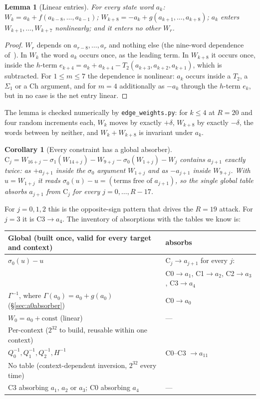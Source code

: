 \documentclass[11pt,a4paper]{article}
\newtheorem{corollary}{Corollary}
\newtheorem{lemma}{Lemma}
\newcommand{\Sig}[1]{\Sigma_{#1}}
\newcommand{\sig}[1]{\sigma_{#1}}
\newcommand{\Ch}{\mathrm{Ch}}
\begin{document}
\begin{lemma}[Linear entries]
\label{lem:linear}
For every state word $a_k$: $W_k = a_k + f(a_{k-8},\ldots,a_{k-1})$;
$W_{k+8} = -a_k + g(a_{k+1},\ldots,a_{k+8})$; $a_k$ enters
$W_{k+1},\ldots,W_{k+7}$ nonlinearly; and it enters no other $W_r$.
\end{lemma}
\begin{proof}
$W_r$ depends on $a_{r-8},\ldots,a_r$ and nothing else (the nine-word
dependence of~\cite{Basra2026R19}).  In $W_k$ the word $a_k$ occurs once, as
the leading term.  In $W_{k+8}$ it occurs once, inside the $h$-term
$e_{k+4}=a_k+a_{k+4}-T_2(a_{k+3},a_{k+2},a_{k+1})$, which is subtracted.  For
$1\le m\le7$ the dependence is nonlinear: $a_k$ occurs inside a $T_2$, a
$\Sig{1}$ or a $\Ch$ argument, and for $m=4$ additionally as $-a_k$ through
the $h$-term $e_k$, but in no case is the net entry linear.
\end{proof}

The lemma is checked numerically by \texttt{edge\_weights.py}: for $k\le4$
at $R{=}20$ and four random increments each, $W_k$ moves by exactly
$+\delta$, $W_{k+8}$ by exactly $-\delta$, the words between by neither, and
$W_k+W_{k+8}$ is invariant under $a_k$.

\begin{corollary}[Every constraint has a global absorber]
\label{cor:absorb}
$\mathrm{C}_j = W_{16+j}-\sig{1}(W_{14+j})-W_{9+j}-\sig{0}(W_{1+j})-W_j$
contains $a_{j+1}$ exactly twice: as $+a_{j+1}$ inside the $\sig{0}$ argument
$W_{1+j}$ and as $-a_{j+1}$ inside $W_{9+j}$.  With $u=W_{1+j}$ it reads
$\sig{0}(u)-u = (\text{terms free of } a_{j+1})$, so the single global table
absorbs $a_{j+1}$ from $\mathrm{C}_j$ for every $j=0,\ldots,R-17$.
\end{corollary}

For $j=0,1,2$ this is the opposite-sign pattern that drives the $R{=}19$
attack.  For $j=3$ it is C3$\to a_4$.  The inventory of absorptions with
the tables we know is:

\begin{center}
\begin{tabular}{@{}ll@{}}
\toprule
Global (built once, valid for every target and context) & absorbs \\
\midrule
$\sig{0}(u)-u$ & C$_j\to a_{j+1}$ for every $j$: \\
 & C0$\to a_1$, C1$\to a_2$, C2$\to a_3$, C3$\to a_4$ \\
$\Gamma^{-1}$, where $\Gamma(a_0)=a_0+g(a_0)$ (\S\ref{sec:a0absorber}) & C0$\to a_0$ \\
$W_0 = a_0 + \mathrm{const}$ (linear) & --- \\
\midrule
Per-context ($2^{32}$ to build, reusable within one context) & \\
\midrule
$Q_0^{-1},Q_1^{-1},Q_2^{-1},H^{-1}$ & C0--C3 $\to a_{11}$ \\
\midrule
No table (context-dependent inversion, $2^{32}$ every time) & \\
\midrule
C3 absorbing $a_1$, $a_2$ or $a_3$; C0 absorbing $a_4$ & --- \\
\bottomrule
\end{tabular}
\end{center}
\end{document}
